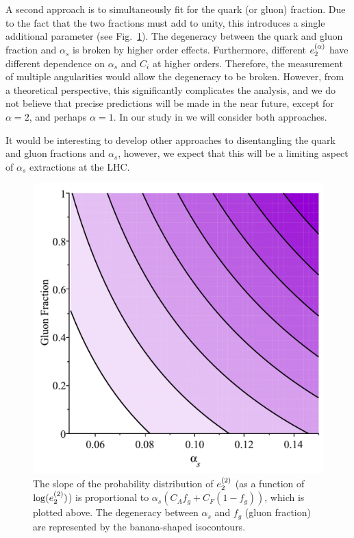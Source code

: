 
A second approach is to simultaneously fit for the quark (or gluon)
fraction. Due to the fact that the two fractions must add to unity,
this introduces a single additional parameter (see
Fig.~\ref{fig:analyticbanana}). The degeneracy between the quark and
gluon fraction and $\alpha_s$ is broken by higher order
effects. Furthermore, different $e_{2}^{(\alpha)}$ have different
dependence on $\alpha_s$ and $C_i$ at higher orders. Therefore, the
measurement of multiple angularities would allow the degeneracy to be
broken. However, from a theoretical perspective, this significantly
complicates the analysis, and we do not believe that precise
predictions will be made in the near future, except for $\alpha=2$,
and perhaps $\alpha=1$.  In our study in  we
will consider both approaches.

It would be interesting to develop other approaches to disentangling the quark and gluon fractions and $\alpha_s$, however, we expect that this will be a limiting aspect of $\alpha_s$ extractions at the LHC.


\begin{figure}[h!]
\begin{center}
\includegraphics[width = 0.4\columnwidth]{figures/Degeneracy}
\end{center}
\caption{The slope of the probability distribution of $e_{2}^{(2)}$ (as a function of $\log(e_{2}^{(2)})$) is proportional to $\alpha_s(C_Af_g+C_F(1-f_g))$, which is plotted above.  The degeneracy between $\alpha_s$ and $f_g$ (gluon fraction) are represented by the banana-shaped isocontours. }
\label{fig:analyticbanana}
\end{figure}



